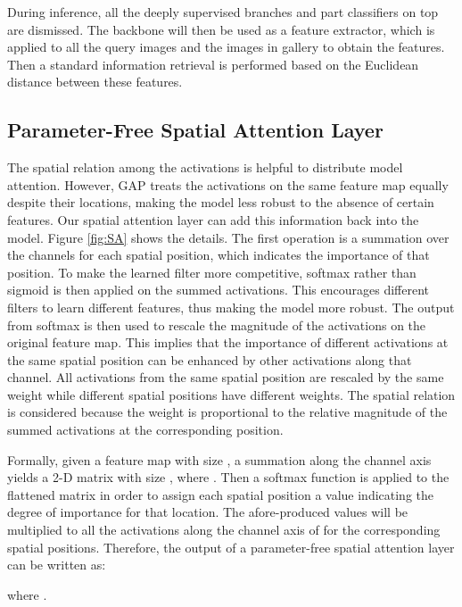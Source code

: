 \documentclass[10pt,twocolumn,letterpaper]{article}
\begin{document}
During inference, all the deeply supervised branches and part classifiers on top are dismissed. The backbone will then be used as a feature extractor, which is applied to all the query images and the images in gallery to obtain the features. Then a standard information retrieval is performed based on the Euclidean distance between these features.



\subsection{Parameter-Free Spatial Attention Layer} \label{31}

The spatial relation among the activations is helpful to distribute model attention. However, GAP treats the activations on the same feature map equally despite their locations, making the model less robust to the absence of certain features. Our spatial attention layer can add this information back into the model.
Figure \ref{fig:SA} shows the details. The first operation is a summation over the channels for each spatial position, which indicates the importance of that position. To make the learned filter more competitive, softmax rather than sigmoid is then applied on the summed activations. This encourages different filters to learn different features, thus making the model more robust. The output from softmax is then used to rescale the magnitude of the activations on the original feature map. This implies that the importance of different activations at the same spatial position can be enhanced by other activations along that channel. All activations from the same spatial position are rescaled by the same weight while different spatial positions have different weights. The spatial relation is considered because the weight is proportional to the relative magnitude of the summed activations at the corresponding position.




Formally, given a feature map  with size , a summation along the channel axis yields a 2-D matrix  with size , where . Then a softmax function is applied to the flattened matrix  in order to assign each spatial position a value  indicating the degree of importance for that location. The afore-produced values will be multiplied to all the activations along the channel axis of  for the corresponding spatial positions. Therefore, the output  of a parameter-free spatial attention layer can be written as:

where .
\end{document}
